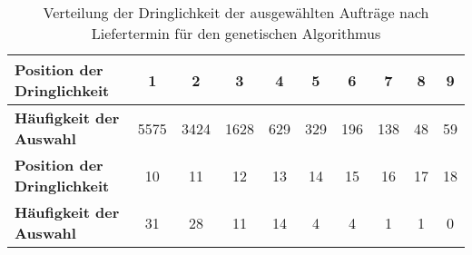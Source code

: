 \begin{table}[ht]
\centering
\begin{tabular}{lccccccccc}
\hline
\textbf{Position der Dringlichkeit} & 1 & 2 & 3 & 4 & 5 & 6 & 7 & 8 & 9 \\
\hline
\textbf{Häufigkeit der Auswahl} & 5575 & 3424 & 1628 & 629 & 329 & 196 & 138 & 48 & 59 \\
\hline
\hline
\textbf{Position der Dringlichkeit} & 10 & 11 & 12 & 13 & 14 & 15 & 16 & 17 & 18 \\
\hline
\textbf{Häufigkeit der Auswahl} & 31 & 28 & 11 & 14 & 4 & 4 & 1 & 1 & 0 \\
\hline
\end{tabular}\vspace{0.4cm}
\caption{Verteilung der Dringlichkeit der ausgewählten Aufträge nach Liefertermin für den genetischen Algorithmus}
\end{table}
